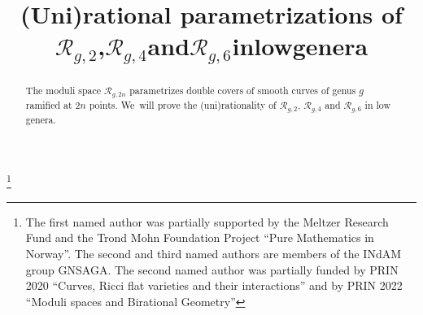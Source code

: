 \documentclass[JEP,XML,SOM,Unicode,NoEqCountersInSection,published]{cedram}
\theoremstyle{plain}
\theoremstyle{definition}
\begin{document}
\frontmatter

\title{(Uni)rational parametrizations \texorpdfstring{of\nobreakspace $\mathcal R_{g,2}$,\nobreakspace $\mathcal R_{g,4}$\nobreakspace and\nobreakspace $\mathcal R_{g,6}$\nobreakspace in\nobreakspace low\nobreakspace genera}{title}}

\author[\initial{A. L.} \lastname{Knutsen}]{ }
\address{Department of Mathematics, University of Bergen,\\
Postboks 7800, 5020 Bergen, Norway}

\author[\initial{M.} \lastname{Lelli-Chiesa}]{ }
\address{Dipartimento di Matematica, Università Roma Tre,\\
Largo San Leonardo Murialdo, 00146 Roma, Italy}

\author[\initial{A.} \lastname{Verra}]{ }
\address{Dipartimento di Matematica, Università Roma Tre,\\
Largo San Leonardo Murialdo, 00146 Roma, Italy}

\thanks{The first named author was partially supported by the
Meltzer Research Fund and the Trond Mohn Foundation Project ``Pure Mathematics in Norway''. The second and third named authors are members of the INdAM group GNSAGA. The second named author was partially funded by PRIN 2020 ``Curves, Ricci flat varieties and their interactions'' and by PRIN 2022 ``Moduli spaces and Birational Geometry''}

\begin{abstract}
The moduli space $\mathcal{R}_{g,2n}$ parametrizes double covers of smooth curves of genus $g$ ramified at $2n$ points. We~will prove the (uni)rationality of $\mathcal{R}_{g,2}$, $\mathcal R_{g,4}$ and $\mathcal R_{g,6}$ in low genera.
\end{abstract}




\end{document}
